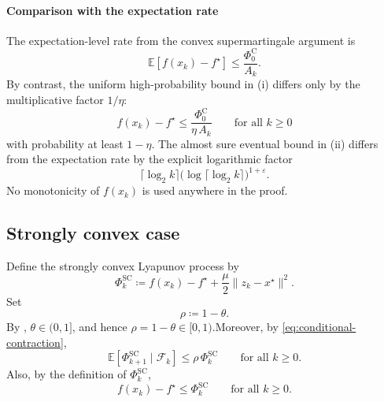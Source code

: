 \documentclass[10pt]{article}
\newcommand{\E}{\mathbb{E}}
\begin{document}
\paragraph{Comparison with the expectation rate}
The expectation-level rate from the convex supermartingale argument is
\[
\E[f(x_k)-f^\star]\le \frac{\Phi_0^{\mathrm C}}{A_k}.
\]
By contrast, the uniform high-probability bound in (i) differs only by the multiplicative factor \(1/\eta\):
\[
f(x_k)-f^\star\le \frac{\Phi_0^{\mathrm C}}{\eta\,A_k}
\qquad\text{for all }k\ge 0
\]
with probability at least \(1-\eta\).
The almost sure eventual bound in (ii) differs from the expectation rate by the explicit logarithmic factor
\[
\bigl\lceil \log_2 k \bigr\rceil
\bigl(\log \lceil \log_2 k \rceil \bigr)^{1+\varepsilon}.
\]
No monotonicity of \(f(x_k)\) is used anywhere in the proof.




\subsection{Strongly convex case}




Define the strongly convex Lyapunov process by
\[
\Phi_k^{\mathrm{SC}}
\coloneqq
f(x_k)-f^\star+\frac{\mu}{2}\|z_k-x^\star\|^2.
\]
Set
\[
\rho\coloneqq 1-\theta.
\]
By , \(\theta\in(0,1]\), and hence
\(\rho=1-\theta\in[0,1)\).Moreover, by
\eqref{eq:conditional-contraction},
\begin{equation}
\label{eq:sc-supermartingale}
\E[\Phi_{k+1}^{\mathrm{SC}}\mid \mathcal F_k]
\le
\rho\,\Phi_k^{\mathrm{SC}}
\qquad\text{for all }k\ge 0.
\end{equation}
Also, by the definition of \(\Phi_k^{\mathrm{SC}}\),
\begin{equation}
\label{eq:sc-dominate-gap}
f(x_k)-f^\star \le \Phi_k^{\mathrm{SC}}
\qquad\text{for all }k\ge 0.
\end{equation}
\end{document}

